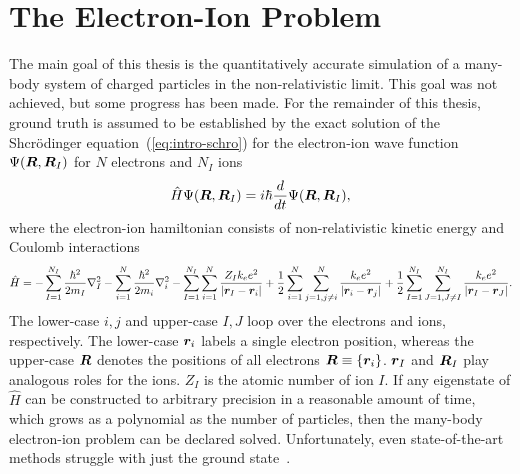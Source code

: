 \begin{comment}
Density matrix
\begin{align}
\rho\propto\exp\left(i\dfrac{S}{\hbar}\right)
\end{align}
\end{comment}

\section{The Electron-Ion Problem}
The main goal of this thesis is the quantitatively accurate simulation of a many-body system of charged particles in the non-relativistic limit.
This goal was not achieved, but some progress has been made.
For the remainder of this thesis, ground truth is assumed to be established by the exact solution of the Shcr\"odinger equation~(\ref{eq:intro-schro}) for the electron-ion wave function $\Psi(\boldsymbol{R},\boldsymbol{R}_I)$ for $N$ electrons and $N_I$ ions
\begin{align} \label{eq:intro-schro}
\hat{H} \Psi(\boldsymbol{R},\boldsymbol{R}_I) = i\hbar\frac{d}{dt}\Psi(\boldsymbol{R},\boldsymbol{R}_I),
\end{align}
where the electron-ion hamiltonian consists of non-relativistic kinetic energy and Coulomb interactions
\begin{align} \label{eq:intro-ei-ham}
\hat{H} =
-\sum\limits_{I=1}^{N_I} \frac{\hbar^2}{2m_I} \nabla^2_I
-\sum\limits_{i=1}^N \frac{\hbar^2}{2m_i}\nabla^2_i
-\sum\limits_{I=1}^{N_I}\sum\limits_{i=1}^N
\frac{Z_Ik_ee^2}{\vert\boldsymbol{r}_I-\boldsymbol{r}_i\vert}
+\frac{1}{2}\sum\limits_{i=1}^N\sum\limits_{j=1,j\neq i}^{N} \frac{k_ee^2}{\vert\boldsymbol{r}_i-\boldsymbol{r}_j\vert}
+\frac{1}{2}\sum\limits_{I=1}^{N_I}\sum\limits_{J=1,J\neq I}^{N_I} \frac{k_ee^2}{\vert\boldsymbol{r}_I-\boldsymbol{r}_J\vert}.
\end{align}
The lower-case $i,j$ and upper-case $I,J$ loop over the electrons and ions, respectively. The lower-case $\boldsymbol{r}_i$ labels a single electron position, whereas the upper-case $\boldsymbol{R}$ denotes the positions of all electrons $\boldsymbol{R}\equiv\{\boldsymbol{r}_i\}$. $\boldsymbol{r}_I$ and $\boldsymbol{R}_I$ play analogous roles for the ions. $Z_I$ is the atomic number of ion $I$. If any eigenstate of $\hat{H}$ can be constructed to arbitrary precision in a reasonable amount of time, which grows as a polynomial as the number of particles, then the many-body electron-ion problem can be declared solved. Unfortunately, even state-of-the-art methods struggle with just the ground state~\cite{Azadi2014,McMinis2015,Drummond2015}.

